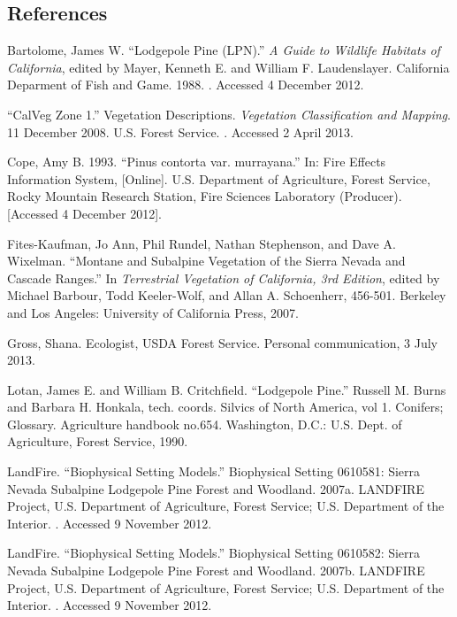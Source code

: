 \subsection*{References}
\begin{hangparas}{.25in}{1} 
Bartolome, James W. ``Lodgepole Pine (LPN).'' \emph{A Guide to Wildlife Habitats of California}, edited by Mayer, Kenneth E. and William F. Laudenslayer. California Deparment of Fish and Game. 1988. . Accessed 4 December 2012.

``CalVeg Zone 1.'' Vegetation Descriptions. \emph{Vegetation Classification and Mapping}.  11 December 2008. U.S. Forest Service. . Accessed 2 April 2013.

Cope, Amy B. 1993. ``Pinus contorta var. murrayana.'' In: Fire Effects Information System, [Online].  U.S. Department of Agriculture, Forest Service,  Rocky Mountain Research Station, Fire Sciences Laboratory (Producer).   [Accessed 4 December 2012].

Fites-Kaufman, Jo Ann, Phil Rundel, Nathan Stephenson, and Dave A. Wixelman. ``Montane and Subalpine Vegetation of the Sierra Nevada and Cascade Ranges.'' In \emph{Terrestrial Vegetation of California, 3rd Edition}, edited by Michael Barbour, Todd Keeler-Wolf, and Allan A. Schoenherr, 456-501. Berkeley and Los Angeles: University of California Press, 2007. 

Gross, Shana. Ecologist, USDA Forest Service. Personal communication, 3 July 2013.

Lotan, James E. and William B. Critchfield. ``Lodgepole Pine.'' Russell M. Burns and Barbara H. Honkala, tech. coords. Silvics of North America, vol 1. Conifers; Glossary. Agriculture handbook no.654. Washington, D.C.: U.S. Dept. of Agriculture, Forest Service, 1990. 

LandFire. ``Biophysical Setting Models.'' Biophysical Setting 0610581: Sierra Nevada Subalpine Lodgepole Pine Forest and Woodland. 2007a. LANDFIRE Project, U.S. Department of Agriculture, Forest Service; U.S. Department of the Interior. . Accessed 9 November 2012.

LandFire. ``Biophysical Setting Models.'' Biophysical Setting 0610582: Sierra Nevada Subalpine Lodgepole Pine Forest and Woodland. 2007b. LANDFIRE Project, U.S. Department of Agriculture, Forest Service; U.S. Department of the Interior. . Accessed 9 November 2012.


\end{hangparas}
